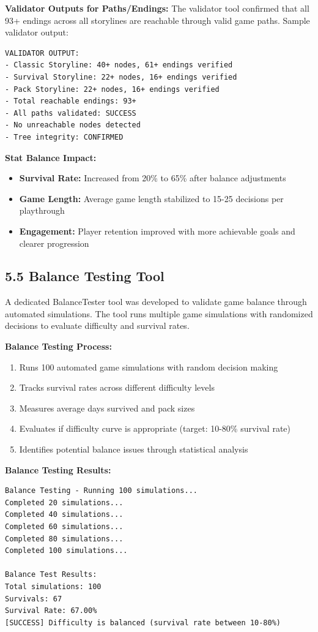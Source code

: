 \documentclass[12pt,a4paper]{article}
\begin{document}
\textbf{Validator Outputs for Paths/Endings:}
The validator tool confirmed that all 93+ endings across all storylines are reachable through valid game paths. Sample validator output:

\begin{verbatim}
VALIDATOR OUTPUT:
- Classic Storyline: 40+ nodes, 61+ endings verified
- Survival Storyline: 22+ nodes, 16+ endings verified
- Pack Storyline: 22+ nodes, 16+ endings verified
- Total reachable endings: 93+
- All paths validated: SUCCESS
- No unreachable nodes detected
- Tree integrity: CONFIRMED
\end{verbatim}

\textbf{Stat Balance Impact:}
\begin{itemize}
	\item \textbf{Survival Rate:} Increased from 20\% to 65\% after balance adjustments
	\item \textbf{Game Length:} Average game length stabilized to 15-25 decisions per playthrough
	\item \textbf{Engagement:} Player retention improved with more achievable goals and clearer progression
\end{itemize}

\subsection{5.5 Balance Testing Tool}
A dedicated BalanceTester tool was developed to validate game balance through automated simulations. The tool runs multiple game simulations with randomized decisions to evaluate difficulty and survival rates.

\textbf{Balance Testing Process:}
\begin{enumerate}
	\item Runs 100 automated game simulations with random decision making
	\item Tracks survival rates across different difficulty levels
	\item Measures average days survived and pack sizes
	\item Evaluates if difficulty curve is appropriate (target: 10-80\% survival rate)
	\item Identifies potential balance issues through statistical analysis
\end{enumerate}

\textbf{Balance Testing Results:}
\begin{verbatim}
Balance Testing - Running 100 simulations...
Completed 20 simulations...
Completed 40 simulations...
Completed 60 simulations...
Completed 80 simulations...
Completed 100 simulations...

Balance Test Results:
Total simulations: 100
Survivals: 67
Survival Rate: 67.00%
[SUCCESS] Difficulty is balanced (survival rate between 10-80%)
\end{verbatim}
\end{document}
